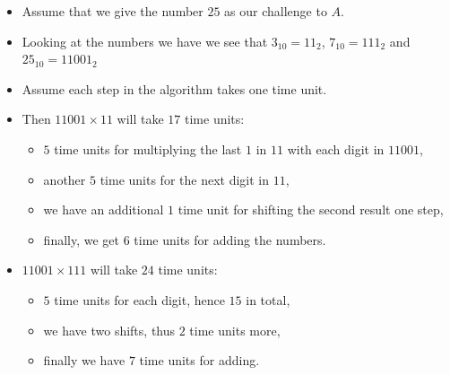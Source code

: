 \begin{frame}
  \begin{itemize}
    \item Assume that we give the number \(25\) as our challenge to \(A\).
    \item Looking at the numbers we have we see that \(3_{10} = 11_2\), 
      \(7_{10} = 111_2\) and \(25_{10} = 11001_2\)

    \item Assume each step in the algorithm takes one time unit.

    \item Then \(11001\times 11\) will take \(17\) time units:
      \begin{itemize}
        \item \(5\) time units for multiplying the last \(1\) in \(11\) with 
          each digit in \(11001\),

        \item another \(5\) time units for the next digit in \(11\),

        \item we have an additional \(1\) time unit for shifting the second 
          result one step,

        \item finally, we get \(6\) time units for adding the numbers.
      \end{itemize}

    \item \(11001\times 111\) will take \(24\) time units:
      \begin{itemize}
        \item \(5\) time units for each digit, hence \(15\) in total,

        \item we have two shifts, thus \(2\) time units more,

        \item finally we have \(7\) time units for adding.
      \end{itemize}
  \end{itemize}
\end{frame}

